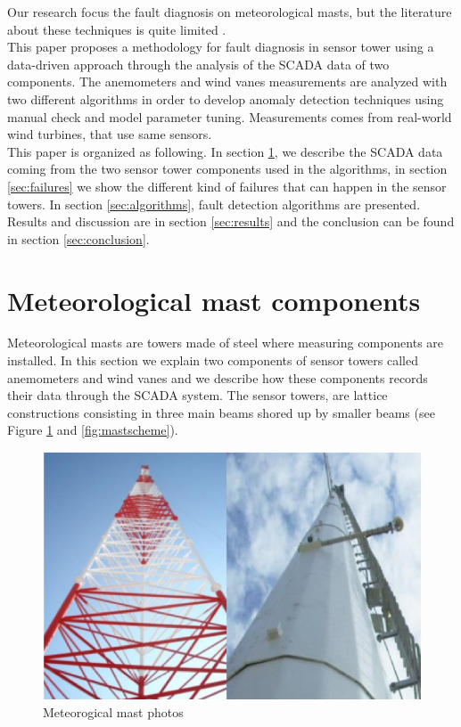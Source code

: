 \documentclass[conference]{IEEEtran}
\begin{document}
Our research focus the fault diagnosis on meteorological masts,   
but the literature about these techniques is quite limited \cite{hasu2006weather} .\\
This paper proposes a methodology for fault diagnosis in sensor tower using a data-driven approach through the analysis of the SCADA data of two components. The anemometers and wind vanes measurements are analyzed with two different algorithms in order to develop anomaly detection techniques using manual check and model parameter tuning. Measurements comes from real-world wind turbines, that use same sensors.  \\
This paper is organized as following. In section \ref{sec:sensortower}, we describe the SCADA data coming from the two sensor tower components used in the algorithms, in section \ref{sec:failures} we show the different kind of failures that can happen in the sensor towers. In section \ref{sec:algorithms}, fault detection algorithms are presented. Results and discussion are in section \ref{sec:results} and the conclusion can be found in section \ref{sec:conclusion}.

\section{Meteorological mast components}\label{sec:sensortower}
Meteorological masts are towers made of steel where measuring components are installed. In this section we explain two components of sensor towers called anemometers and wind vanes and we describe how these components records their data through the SCADA system.
The sensor towers, are  lattice constructions consisting in three main beams shored up by smaller beams (see Figure \ref{fig:mastphoto} and \ref{fig:mastscheme}). 
\begin{figure}[h]
	\centering
	\includegraphics[width=\columnwidth]{Images/MeteorologicalMast.png}
	\caption{Meteorogical mast photos}
	\label{fig:mastphoto}
\end{figure}
\end{document}
